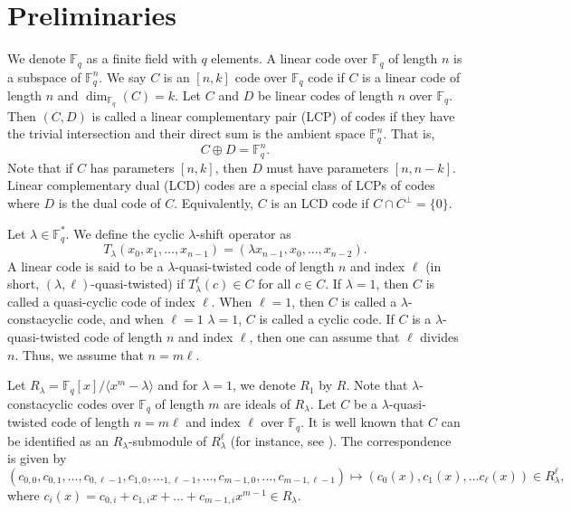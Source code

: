 \documentclass[12 pt]{extarticle}
\numberwithin{equation}{section}
\theoremstyle{definition}
\begin{document}
\section{Preliminaries}\label{pre}
We denote $\mathbb{F}_q$ as a finite field with $q$ elements. A linear code over $\mathbb{F}_q$ of length $n$  is a subspace of $\mathbb{F}_q^n$. We say $C$ is an $[n,k]$ code over $\mathbb{F}_q$ code if $C$ is a linear code of length $n$ and $\dim_{\mathbb{F}_q}(C)=k$. Let $C$ and $D$ be linear codes of length $n$ over $\mathbb{F}_q$. Then $(C, D)$ is called a linear complementary pair (LCP) of codes if they have the trivial intersection and their direct sum is the ambient space $\mathbb{F}_q^n$. That is,
$$ C\oplus D=\mathbb{F}_q^n.$$
Note that if $C$ has parameters $[n,k]$, then $D$ must have parameters $[n,n-k]$.   Linear complementary dual (LCD) codes are a special class of LCPs of codes where $D$ is the dual code of $C$. Equivalently, $C$  is an LCD code if $C\cap C^{\perp}=\{0\}$. 

 Let $\lambda \in \mathbb{F}_q^*$. We define the cyclic $\lambda$-shift operator as 
 $$T_{\lambda}(x_0,x_1,\dots,x_{n-1})=(\lambda x_{n-1},x_0,\dots,x_{n-2}).$$
 A linear code is said to be a $\lambda$-quasi-twisted code of length $n$ and index $\ell$ (in short, $(\lambda,\ell)$-quasi-twisted) if $T_{\lambda}^\ell(c)\in C$ for all $c\in C$. If $\lambda=1$, then $C$ is  called a quasi-cyclic code of index $\ell$. When $\ell=1$, then $C$ is called  a $\lambda$-constacyclic code, and when $\ell=1$ $\lambda=1$, $C$ is called a cyclic code. If $C$ is a $\lambda$-quasi-twisted code of length $n$ and index $\ell$, then one can assume that $\ell$ divides $n$. Thus, we assume that $n=m\ell$. 

 Let $R_\lambda=\mathbb{F}_q[x]/\langle x^m-\lambda\rangle$ and for $\lambda=1$, we denote $R_1$ by $R$. Note that $\lambda$-constacyclic codes over $\mathbb{F}_q$ of length $m$ are ideals of $R_\lambda$. Let $C$ be a $\lambda$-quasi-twisted code of length $n=m\ell$ and index $\ell$ over $\mathbb{F}_q$. It is well known that $C$ can be identified as an $R_\lambda$-submodule of $R_\lambda^\ell$ (for instance, see \cite{jia2012}). The correspondence is given by
 $$(c_{0,0},c_{0,1},\dots,c_{0,\ell-1},c_{1,0},\dotsc_{1,\ell-1},\dots,c_{m-1,0},\dots,c_{m-1,\ell-1})\mapsto (c_0(x),c_1(x),\dots c_\ell(x))\in R_\lambda^\ell,$$
 where $c_i(x)=c_{0,i}+c_{1,i}x+\dots+c_{m-1,i}x^{m-1}\in R_\lambda$. 
\end{document}
